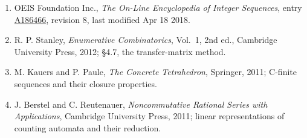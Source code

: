\documentclass[11pt]{article}
\theoremstyle{definition}
\begin{document}
\begin{enumerate}

\item OEIS Foundation Inc., \emph{The On-Line Encyclopedia of Integer Sequences}, entry \href{https://oeis.org/A186466}{A186466}, revision 8, last modified Apr 18 2018.

\item R. P. Stanley, \emph{Enumerative Combinatorics}, Vol.~1, 2nd ed., Cambridge University Press, 2012; \S4.7, the transfer-matrix method.

\item M. Kauers and P. Paule, \emph{The Concrete Tetrahedron}, Springer, 2011; C-finite sequences and their closure properties.

\item J. Berstel and C. Reutenauer, \emph{Noncommutative Rational Series with Applications}, Cambridge University Press, 2011; linear representations of counting automata and their reduction.

\end{enumerate}
\end{document}
